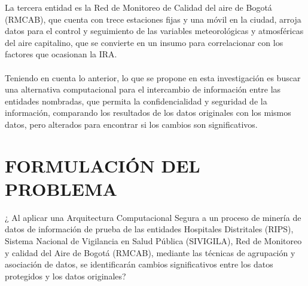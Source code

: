 \documentclass[a4paper,openright,12pt]{book}
\theoremstyle{definition}
\theoremstyle{remark}
\begin{document}
La tercera entidad es la Red de Monitoreo de Calidad del aire de Bogotá (RMCAB), que cuenta con trece estaciones fijas y una móvil en la ciudad, arroja datos para el control y seguimiento de las variables meteorológicas y atmosféricas del aire capitalino, que se convierte en un insumo para correlacionar con los factores que ocasionan la IRA.\\\\
Teniendo  en cuenta lo anterior, lo  que se propone  en esta investigación es buscar una alternativa computacional para el intercambio de información entre las entidades nombradas, que permita la confidencialidad y seguridad de la información, comparando los resultados de los datos originales con los mismos datos, pero alterados para encontrar si los cambios son significativos.

\section{FORMULACIÓN DEL PROBLEMA}

¿ Al aplicar una Arquitectura Computacional Segura a un proceso de minería de datos de información de prueba de las entidades Hospitales Distritales (RIPS), Sistema Nacional de Vigilancia en Salud Pública (SIVIGILA), Red de Monitoreo y calidad del Aire de Bogotá (RMCAB), mediante las técnicas de agrupación y asociación de datos, se identificarán cambios significativos entre los datos protegidos y los datos originales?
\end{document}
